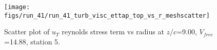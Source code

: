 \begin{figure}[H]
\centering
\texttt{[image: figs/run\_41/run\_41\_turb\_visc\_ettap\_top\_vs\_r\_meshscatter]}
\caption{Scatter plot of $
u_T$ reynolds stress term vs radius at $z/c$=9.00, $V_{free}$=14.88, station 5.}
\label{fig:run_41_turb_visc_ettap_top_vs_r_meshscatter}
\end{figure}


